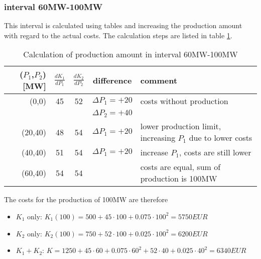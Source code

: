 \documentclass{article}
\begin{document}
	\subsubsection{interval 60MW-100MW}
This interval is calculated using tables and increasing the production amount with regard to the actual costs. The calculation steps are listed in table \ref{tab:60100MW}.
	\begin{table}[hbt!]
		\begin{center}
			\begin{tabular}[h]{|r||c|c|c||p{5cm}|}
				\hline 
				($P_1$,$P_2$) [MW] & $\frac{dK_1}{dP_1}$ & $\frac{dK_2}{dP_2}$ & difference & comment\\
				\hline
				\hline
				(0,0)	&	45	&	52	&	$\Delta P_1=+20$	&	costs without production									\\
						&    	&   	& 	$\Delta P_2=+40$ 	&					    										\\
				\hline
				(20,40) &	48	&	54	&	$\Delta P_1=+20$	&	lower production limit, increasing $P_1$ due to lower costs	\\
				\hline
				(40,40) &	51	&	54	&	$\Delta P_1=+20$	&	increase $P_1$, costs are still lower						\\
				\hline
				(60,40) &	54	&	54	&						&	costs are equal, sum of production is 100MW					\\
				\hline
			\end{tabular}
			\caption{Calculation of production amount in interval 60MW-100MW}\label{tab:60100MW}
		\end{center}
	\end{table}
	The costs for the production of 100MW are therefore
		\begin{itemize}
			\item $K_1$ only: $K_1(100)=500+45\cdot 100+0.075\cdot 100^2=5750EUR$
			\item $K_2$ only: $K_2(100)=750+52\cdot 100+0.025\cdot 100^2=6200EUR$
			\item $K_1+K_2$: $K=1250+45\cdot 60+0.075\cdot 60^2 + 52\cdot 40+0.025\cdot 40^2=6340EUR$
		\end{itemize}
\end{document}
